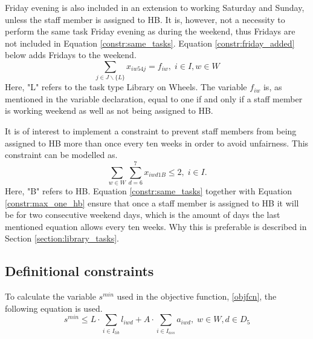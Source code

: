 Friday evening is also included in an extension to working Saturday and Sunday, unless the staff member is assigned to HB. It is, however, not a necessity to perform the same task Friday evening as during the weekend, thus Fridays are not included in Equation \ref{constr:same_tasks}. Equation \ref{constr:friday_added} below adds Fridays to the weekend.
\begin{equation} \label{constr:friday_added}
\sum_{j \in J \backslash \{L\}}x_{iw54j} = f_{iw}, \;   i \in I, w \in W
\end{equation}
Here, "L" refers to the task type Library on Wheels. The variable $f_{iw}$ is, as mentioned in the variable declaration, equal to one if and only if a staff member is working weekend as well as not being assigned to HB.

It is of interest to implement a constraint to prevent staff members from being assigned to HB more than once every ten weeks in order to avoid unfairness. This constraint can be modelled as.
\begin{equation} \label{constr:max_one_hb}
\sum_{w \in W}\sum_{d = 6}^{7}x_{iwd1B} \leq 2, \;   i \in I.
\end{equation}
Here, "B" refers to HB. Equation \ref{constr:same_tasks} together with Equation \ref{constr:max_one_hb} ensure that once a staff member is assigned to HB it will be for two consecutive weekend days, which is the amount of days the last mentioned equation allows every ten weeks. Why this is preferable is described in Section \ref{section:library_tasks}.

\subsection{Definitional constraints} \label{section:obj_fcn_constraints}
To calculate the variable $s^{min}$ used in the objective function, \ref{objfcn}, the following equation is used.
\begin{equation} \label{constr:s_min}
s^{min} \leq L\cdot \sum_{i \in I_{lib}} l_{iwd} + A\cdot \sum_{i \in I_{ass}} a_{iwd}, \;   w \in W, d \in D_5
\end{equation}

